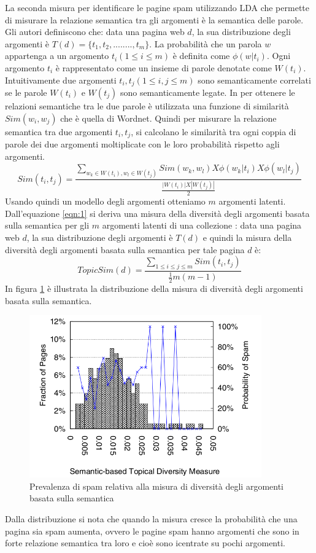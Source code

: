 La seconda misura per identificare le pagine spam utilizzando LDA che permette di misurare la relazione semantica tra gli argomenti è  la semantica delle parole. Gli autori definiscono che: data una pagina web \(d\), la sua distribuzione degli argomenti è \(T(d)=\{t_1,t_2,........,t_m\}\). La probabilità che un parola \(w\) appartenga a un argomento \(t_i (1 \leq i \leq m )\) è definita come \(\phi(w|t_i)\). Ogni argomento \(t_i\) è rappresentato come un insieme di parole denotate come \(W(t_i)\). Intuitivamente due argomenti \(t_i, t_j (1 \leq i, j \leq m)\) sono semanticamente correlati se le parole \(W(t_i)\) e \(W(t_j)\) sono semanticamente legate. In \cite{Dong:2012:EDC:2457524.2457693} per ottenere le relazioni semantiche tra le due parole è utilizzata una funzione di similarità \(Sim(w_i,w_j)\) che è quella di Wordnet. Quindi per misurare la relazione semantica tra due argomenti \(t_i,t_j\), si calcolano le similarità tra ogni coppia di parole dei due argomenti moltiplicate con le loro probabilità 
rispetto agli argomenti.
\begin{equation}
\label{eqn:1}
Sim(t_i,t_j) = \frac{\sum_{w_k \in W(t_i),w_l \in W(t_j)}Sim(w_k,w_l) X \phi(w_k|t_i) X \phi(w_l|t_j)}{\frac{|W(t_i)| X |W(t_j)|}{2}}	
\end{equation}
Usando quindi un modello degli argomenti otteniamo \(m\) argomenti latenti. Dall'equazione \ref{eqn:1} si deriva una misura della diversità degli argomenti basata sulla semantica per gli \(m\) argomenti latenti di una collezione \cite{Dong:2012:EDC:2457524.2457693}: data una pagina web \(d\), la sua distribuzione degli argomenti è \(T(d)\) e quindi la misura della diversità degli argomenti basata sulla semantica per tale pagina \(d\) è:
\begin{equation}
TopicSim(d)=\frac{\sum_{1 \leq i \leq j \leq m} Sim(t_i,t_j)}{\frac{1}{2} m(m-1)}
\end{equation}
In figura \ref{fig:zhou3} è illustrata la distribuzione della misura di diversità degli argomenti basata sulla semantica.
\begin{figure}
\centering
\includegraphics[width=10cm]{immagini/zhou/immagine3}
\caption{Prevalenza di spam relativa alla misura di diversità degli argomenti basata sulla semantica}
\label{fig:zhou3}
\end{figure}
Dalla distribuzione si nota che quando la misura cresce la probabilità che una pagina sia spam aumenta, ovvero le pagine spam hanno argomenti che sono in forte relazione semantica tra loro e cioè sono icentrate su pochi argomenti.

